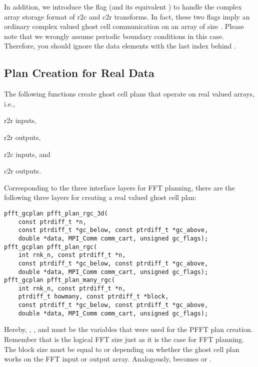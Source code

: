 In addition, we introduce the flag  (and its equivalent )
to handle the complex array storage format of r2c and c2r transforms.
In fact, these two flags imply an ordinary complex valued ghost cell communication on an array of size
. Please note that we wrongly assume periodic boundary
conditions in this case. Therefore, you should ignore the data elements with the last index behind .


\subsection{Plan Creation for Real Data}\label{sec:gc:plan-rdata}
The following functions create ghost cell plans that operate on real valued arrays, i.e.,
\begin{compactitem}
  \item r2r inputs,
  \item r2r outputs,
  \item r2c inputs, and
  \item c2r outputs.
\end{compactitem}
Corresponding to the three interface layers for FFT planning, there are the following three layers
for creating a real valued ghost cell plan:
\begin{lstlisting}
pfft_gcplan pfft_plan_rgc_3d(
    const ptrdiff_t *n,
    const ptrdiff_t *gc_below, const ptrdiff_t *gc_above,
    double *data, MPI_Comm comm_cart, unsigned gc_flags);
pfft_gcplan pfft_plan_rgc(
    int rnk_n, const ptrdiff_t *n,
    const ptrdiff_t *gc_below, const ptrdiff_t *gc_above,
    double *data, MPI_Comm comm_cart, unsigned gc_flags);
pfft_gcplan pfft_plan_many_rgc(
    int rnk_n, const ptrdiff_t *n,
    ptrdiff_t howmany, const ptrdiff_t *block,
    const ptrdiff_t *gc_below, const ptrdiff_t *gc_above,
    double *data, MPI_Comm comm_cart, unsigned gc_flags);
\end{lstlisting}
Hereby, , ,  and  must be the variables that were
used for the PFFT plan creation. Remember that  is the logical FFT size just as it is the case for FFT planning.
The block size  must be equal to  or 
depending on whether the ghost cell plan works on the FFT input or output array.
Analogously,  becomes  or .
